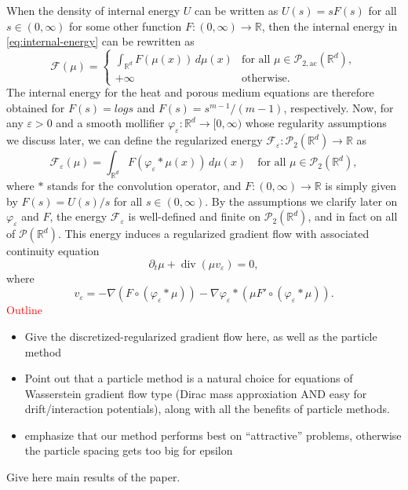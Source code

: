 \documentclass[11pt,leqno]{amsart}
\theoremstyle{definition}
\newcommand{\bes}{\begin{equation*}}
\newcommand{\ees}{\end{equation*}}
\newcommand{\comment}[1]{{\color{red}#1}} %
\newcommand{\R}{{\mathord{\mathbb R}}}
\newcommand{\grad}{\nabla}
\newcommand{\F}{\mathcal{F}}
\def\P{{\mathcal P}}
\def\Pac{\mathcal{P}_{\mathrm{2,ac}}}
\def\e{\varepsilon}
\def\F{\mathcal{F}}
\DeclareMathOperator{\dive}{div}
\begin{document}
When the density of internal energy $U$ can be written as $U(s)=sF(s)$ for all $s\in(0,\infty)$ for some other function $F\colon (0,\infty) \to \R$, then the internal energy in \eqref{eq:internal-energy} can be rewritten as
\bes
	\F(\mu) = \begin{cases}
		\displaystyle \int_{\R^d} F(\mu(x)) \,d\mu(x) & \mbox{for all $\mu \in \Pac(\R^d)$},\\
		+\infty & \mbox{otherwise}.
	\end{cases}
\ees
The internal energy for the heat and porous medium equations are therefore obtained for $F(s) = log s$ and $F(s) = s^{m-1}/(m-1)$, respectively. Now, for any $\e>0$ and a smooth mollifier $\varphi_\e \colon \R^d \to [0,\infty)$ whose regularity assumptions we discuss later, we can define the regularized energy $\F_\e \colon \P_2(\R^d) \to \R$ as
\bes
	\F_\e(\mu) = \int_{\R^d} F(\varphi_\e*\mu(x)) \,d\mu(x) \quad \mbox{for all $\mu\in \P_2(\R^d)$},
\ees
where $*$ stands for the convolution operator, and $F\colon (0,\infty) \to \R$ is simply given by $F(s) = U(s)/s$ for all $s\in(0,\infty)$. By the assumptions we clarify later on $\varphi_\e$ and $F$, the energy $\F_\e$ is well-defined and finite on $\P_2(\R^d)$, and in fact on all of $\P(\R^d)$. This energy induces a regularized gradient flow with associated continuity equation
\bes	
	\partial_t \mu + \dive \left( \mu v_\e \right) = 0,
\ees
where
\bes
	v_\e = - \grad \left(F\circ (\varphi_\e * \mu)\right) - \grad\varphi_\e * \left(\mu F'\circ(\varphi_\e*\mu)\right).
\ees
\textcolor{red}{Outline}
\begin{itemize}
\item Give the discretized-regularized gradient flow here, as well as the particle method
\item Point out that a particle method is a natural choice for equations of Wasserstein gradient flow type (Dirac mass approxiation AND easy for drift/interaction potentials), along with all the benefits of particle methods.
\item emphasize that our method performs best on ``attractive'' problems, otherwise the particle spacing gets too big for epsilon
\end{itemize}

\comment{Give here main results of the paper.}
\end{document}
